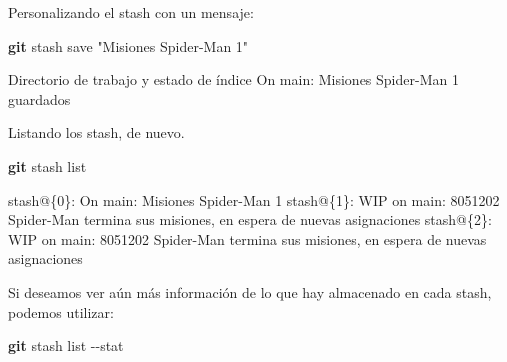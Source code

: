 \documentclass[
]{book}
\newenvironment{Shaded}{\begin{snugshade}}{\end{snugshade}}
\newcommand{\AttributeTok}[1]{\textcolor[rgb]{0.13,0.29,0.53}{#1}}
\newcommand{\ExtensionTok}[1]{#1}
\newcommand{\FunctionTok}[1]{\textcolor[rgb]{0.13,0.29,0.53}{\textbf{#1}}}
\newcommand{\NormalTok}[1]{#1}
\newcommand{\StringTok}[1]{\textcolor[rgb]{0.31,0.60,0.02}{#1}}
\begin{document}
Personalizando el stash con un mensaje:

\begin{Shaded}
\begin{Highlighting}[]
\FunctionTok{git}\NormalTok{ stash save }\StringTok{"Misiones Spider{-}Man 1"}
\end{Highlighting}
\end{Shaded}

\begin{Shaded}
\begin{Highlighting}[]
\ExtensionTok{Directorio}\NormalTok{ de trabajo y estado de índice On main: Misiones Spider{-}Man 1 guardados}
\end{Highlighting}
\end{Shaded}

Listando los stash, de nuevo.

\begin{Shaded}
\begin{Highlighting}[]
\FunctionTok{git}\NormalTok{ stash list}
\end{Highlighting}
\end{Shaded}

\begin{Shaded}
\begin{Highlighting}[]
\ExtensionTok{stash@\{0\}:}\NormalTok{ On main: Misiones Spider{-}Man 1}
\ExtensionTok{stash@\{1\}:}\NormalTok{ WIP on main: 8051202 Spider{-}Man termina sus misiones, en espera de nuevas asignaciones}
\ExtensionTok{stash@\{2\}:}\NormalTok{ WIP on main: 8051202 Spider{-}Man termina sus misiones, en espera de nuevas asignaciones}
\end{Highlighting}
\end{Shaded}

Si deseamos ver aún más información de lo que hay almacenado en cada stash, podemos utilizar:

\begin{Shaded}
\begin{Highlighting}[]
\FunctionTok{git}\NormalTok{ stash list }\AttributeTok{{-}{-}stat}
\end{Highlighting}
\end{Shaded}
\end{document}
